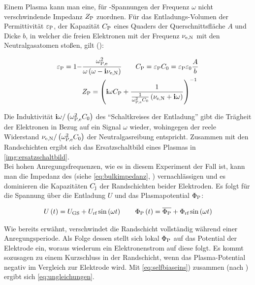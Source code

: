         Einem Plasma kann man eine, für -Spannungen der Frequenz $\omega$ nicht verschwindende Impedanz $Z_\text{P}$ zuordnen. Für das Entladungs-Volumen der Permittivität $\varepsilon_\text{P}$, der Kapazität $C_\text{P}$ eines Quaders der Querschnittsfläche $A$ und Dicke $b$, in welcher die freien Elektronen mit der Frequenz $\nu_\text{e,N}$ mit den Neutralgasatomen stoßen, gilt (\cite{Piel10}):

        \begin{align}
        \varepsilon_\text{P}=1-&\frac{\omega_\text{P,e}^2}{\omega\left(\omega-\mathbf{i}\nu_\text{e,N}\right)} \quad \quad C_\text{P}=\varepsilon_\text{P}C_\text{0}=\varepsilon_\text{P}\varepsilon_\text{0}\frac{A}{b} \\
        &Z_\text{P}=\left(\mathbf{i}\omega C_\text{P}+ \frac{1}{\frac{1}{\omega_\text{P,e}^2C_\text{0}}\left(\nu_\text{e,N}+\mathbf{i}\omega\right)}\right)^{-1}
        \label{eq:bulkimpedanz}
        \end{align}

        Die Induktivität $\mathbf{i}\omega/\left(\omega_\text{P,e}^2C_\text{0}\right)$ des "`Schaltkreises der Entladung"' gibt die Trägheit der Elektronen in Bezug auf ein Signal $\omega$ wieder, wohingegen der reele Widerstand $\nu_\text{e,N}/\left(\omega_\text{P,e}^2C_\text{0}\right)$ der Neutralgasreibung entspricht. Zusammen mit den Randschichten ergibt sich das Ersatzschaltbild eines Plasmas in \autoref{img:ersatzschaltbild}.\\
        Bei hohen Anregungsfrequenzen, wie es in diesem Experiment der Fall ist, kann man die Impedanz des  (siehe \autoref{eq:bulkimpedanz}, \cite{Kay85}) vernachlässigen und es dominieren die Kapazitäten $C_\text{j}$ der Randschichten beider Elektroden. Es folgt für die Spannung über die Entladung $U$ und das Plasmapotential $\Phi_\text{P}$:

          \begin{align}
            U\left(t\right)=U_\text{GS}+U_\text{rf}\sin\left(\omega t\right) \quad \quad \Phi_\text{P}\left(t\right)=\overline{\Phi_\text{P}}+\Phi_\text{rf}\sin\left(\omega t\right) \label{eq:selfbiaseins}
          \end{align}

        Wie bereits erwähnt, verschwindet die Randschicht vollständig während einer Anregungsperiode. Als Folge dessen stellt sich lokal $\Phi_\text{P}$ auf das Potential der Elektrode ein, woraus wiederum ein Elektronenstrom auf diese folgt. Es kommt sozusagen zu einem Kurzschluss in der Randschicht, wenn das Plasma-Potential negativ im Vergleich zur Elektrode wird. Mit \autoref{eq:selfbiaseins}) zusammen (nach \cite{Piel10}) ergibt sich \autoref{eq:ungleichungen}.

